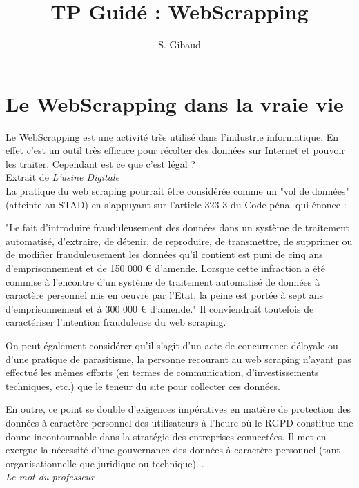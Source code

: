 \documentclass[12pt,fleqn]{article} %
\author{S. Gibaud}
\begin{document}
\title{TP Guidé : WebScrapping}
\maketitle

\section{Le WebScrapping dans la vraie vie}

Le WebScrapping est une activité très utilisé dans l'industrie informatique. En effet c'est un outil très efficace pour récolter des données sur Internet et pouvoir les traiter. Cependant est ce que c'est légal ? \\

Extrait de \textit{L'usine Digitale} \\

La pratique du web scraping pourrait être considérée comme un "vol de données" (atteinte au STAD) en s’appuyant sur l’article 323-3 du Code pénal qui énonce :

"Le fait d'introduire frauduleusement des données dans un système de traitement automatisé, d'extraire, de détenir, de reproduire, de transmettre, de supprimer ou de modifier frauduleusement les données qu'il contient est puni de cinq ans d'emprisonnement et de 150 000 € d'amende. Lorsque cette infraction a été commise à l'encontre d'un système de traitement automatisé de données à caractère personnel mis en oeuvre par l'Etat, la peine est portée à sept ans d'emprisonnement et à 300 000 € d'amende." Il conviendrait toutefois de caractériser l’intention frauduleuse du web scraping.

On peut également considérer qu’il s’agit d’un acte de concurrence déloyale ou d’une pratique de parasitisme, la personne recourant au web scraping n’ayant pas effectué les mêmes efforts (en termes de communication, d’investissements techniques, etc.) que le teneur du site pour collecter ces données.

En outre, ce point se double d’exigences impératives en matière de protection des données à caractère personnel des utilisateurs à l’heure où le RGPD constitue une donne incontournable dans la stratégie des entreprises connectées. Il met en exergue la nécessité d’une gouvernance des données à caractère personnel (tant organisationnelle que juridique ou technique)... \\

\textit{Le mot du professeur}\\
\end{document}
